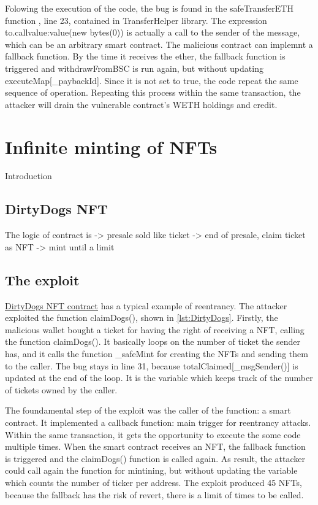 Folowing the execution of the code, the bug is found in the safeTransferETH function , line 23, contained in TransferHelper library. 
The expression to.call{value:value}(new bytes(0)) is actually a call to the sender of the message, which can be an arbitrary smart contract. 
The malicious contract can implemnt a fallback function. By the time it receives the ether, the fallback function is 
triggered and withdrawFromBSC is run again, but without updating executeMap[\_paybackId]. 
Since it is not set to true, the code repeat the same sequence of operation. 
Repeating this process within the same transaction, the attacker will drain the vulnerable contract's WETH holdings and credit.



\section{Infinite minting of NFTs}   
\label{sec:Exploits:DirtyDogs}
Introduction
\subsection{DirtyDogs NFT}
The logic of contract is 
-> presale sold like ticket
-> end of presale, claim ticket as NFT
-> mint until a limit 

\subsection{The exploit}
\label{sec:DirtyDogs:Exploit}
\href{https://etherscan.io/address/0x540cc373acfacd250a4250d7b26e9800b71f0484#code}{DirtyDogs NFT contract} has a typical example of reentrancy.
The attacker exploited the function claimDogs(), shown in \autoref{lst:DirtyDogs}.
Firstly, the malicious wallet bought a ticket for having the right of receiving a NFT, calling the function claimDogs().
It basically loops on the number of ticket the sender has, and it calls the function \_safeMint for creating the NFTs and sending them to 
the caller.
The bug stays in line 31, because totalClaimed[\_msgSender()] is updated at the end of the loop. It is the variable which 
keeps track of the number of tickets owned by the caller.

The foundamental step of the exploit was the caller of the function: a smart contract. It implemented a 
callback function: main trigger for reentrancy attacks. 
Within the same transaction, it gets the opportunity to execute the some code multiple times. 
When the smart contract receives an NFT, the fallback function is triggered and the claimDogs() function is called again. 
As result, the attacker could call again the function for mintining, but without updating the variable which counts the number of ticker per address.
The exploit produced 45 NFTs, because the fallback has the risk of revert, 
there is a limit of times to be called.

